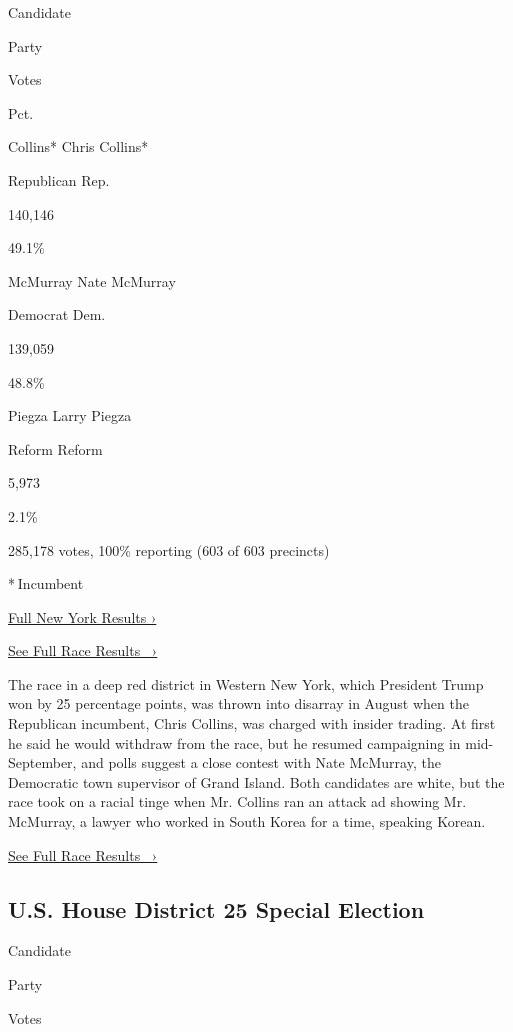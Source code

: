Candidate

Party

Votes

Pct.

 Collins* Chris Collins*

Republican Rep.

140,146

49.1\%

 McMurray Nate McMurray

Democrat Dem.

139,059

48.8\%

 Piegza Larry Piegza

Reform Reform

5,973

2.1\%

285,178 votes, 100\% reporting (603 of 603 precincts)

* Incumbent

\href{https://www.nytimes3xbfgragh.onion/interactive/2018/11/06/us/elections/results-new-york-elections.html}{Full
New York Results ›}

\href{https://www.nytimes3xbfgragh.onion/elections/results/new-york-house-district-27}{See
Full Race Results~ ›}

The race in a deep red district in Western New York, which President
Trump won by 25 percentage points, was thrown into disarray in August
when the Republican incumbent, Chris Collins, was charged with insider
trading. At first he said he would withdraw from the race, but he
resumed campaigning in mid-September, and polls suggest a close contest
with Nate McMurray, the Democratic town supervisor of Grand Island. Both
candidates are white, but the race took on a racial tinge when Mr.
Collins ran an attack ad showing Mr. McMurray, a lawyer who worked in
South Korea for a time, speaking Korean.

\href{https://www.nytimes3xbfgragh.onion/elections/results/new-york-house-district-27}{See
Full Race Results~ ›}

\hypertarget{us-house-district-25-special-election}{%
\subsection{U.S. House District 25 Special
Election}\label{us-house-district-25-special-election}}

Candidate

Party

Votes

